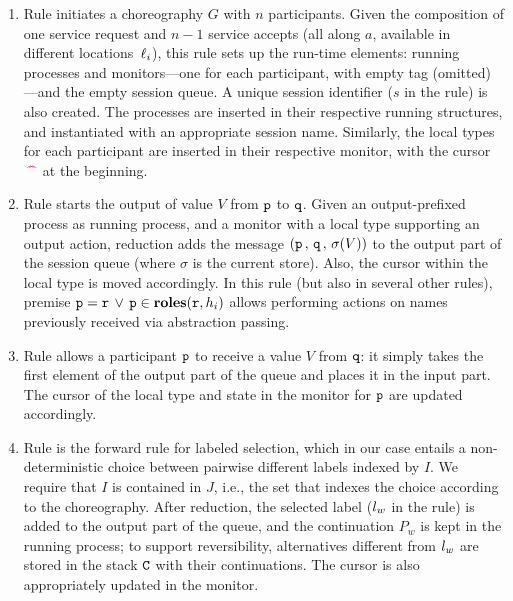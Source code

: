 \documentclass[runningheads]{llncs}
\newcommand{\erase}[1]{#1}
\begin{document}
\begin{enumerate}[$\fwcolor{\blacktriangleright}$]
\item Rule  initiates a choreography  $G$ with $n$ participants.
Given the composition of one service request and $n-1$ service accepts (all along $a$, available in different locations~$\ell_i$),
this rule sets up the run-time elements:
running processes and  monitors---one for each participant, with empty tag (omitted)---and the empty session queue. 
A unique session identifier  ($s$ in the rule) is also created.
The processes are inserted in 
their respective running structures, and instantiated with an appropriate session name.
Similarly, the local types for each participant are inserted in their respective monitor, with the cursor $\,\textcolor{magenta}{\text{\textbf{\textasciicircum\!\!\textasciicircum}}}$ at the beginning.

\item Rule  starts the output of value $V$ from $\mathtt{p}$ to $\mathtt{q}$. Given an output-prefixed process as running process,
and a monitor with a local type supporting an output action, reduction adds the message $(\mathtt{p} \,,\, \mathtt{q} \,,\,\sigma(V))$ to the output part of the session queue (where $\sigma$ is the current store). Also, the cursor within the local type is moved accordingly.
In this rule (but also in several other rules), premise $\mathtt{p} = \mathtt{r} \,\vee\, \mathtt{p} \in \mathtt{\mathbf{roles}}(\mathtt{r}, h_i)$ allows performing actions on names previously received via abstraction passing.

\item Rule  allows a participant $\mathtt{p}$ to receive a value $V$ from $\mathtt{q}$: it 
simply takes the first element of the output part of the queue and places it in the input part.
The cursor of the local type and state in the  monitor for $\mathtt{p}$ are updated accordingly.

 
\item 
\erase{Rule  is the forward rule for labeled selection, which in our case entails a non-deterministic choice between 
pairwise different labels indexed by $I$. %
We require that $I$ is contained in $J$, i.e., the set that indexes the choice according to the choreography. 
After reduction, the selected label ($l_w$ in the rule) is added to the output part of the queue, and the continuation $P_w$ is kept in the running process;
to support reversibility,
alternatives different from $l_w$ are stored in the stack $\mathtt{C}$ with their continuations.
The cursor is also appropriately updated in the  monitor.}


\end{enumerate}
\end{document}
